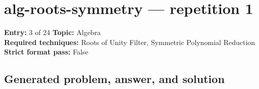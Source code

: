 \documentclass[11pt]{article}
\begin{document}
\section{alg-roots-symmetry --- repetition 1}
\begin{minipage}{\textwidth}
\color{metadata}\small\raggedright
\textbf{Entry:} 3 of 24\quad
\textbf{Topic:} Algebra\\[2pt]
\textbf{Required techniques:} Roots of Unity Filter, Symmetric Polynomial Reduction\\[2pt]
\textbf{Strict format pass:} False
\end{minipage}

\subsection*{Generated problem, answer, and solution}
\end{document}
